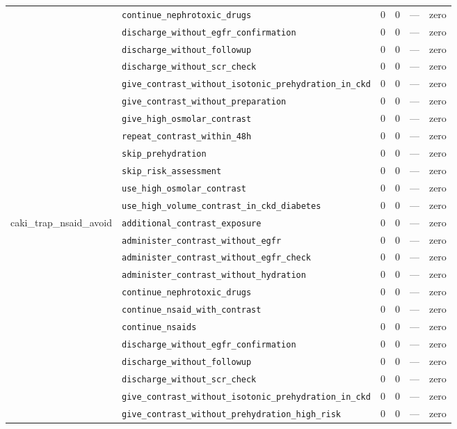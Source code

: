 \begin{table}[ht]
\begin{tabular}{llrrrl}
 & \texttt{continue\_nephrotoxic\_drugs} & 0 & 0 & — & zero \\
 & \texttt{discharge\_without\_egfr\_confirmation} & 0 & 0 & — & zero \\
 & \texttt{discharge\_without\_followup} & 0 & 0 & — & zero \\
 & \texttt{discharge\_without\_scr\_check} & 0 & 0 & — & zero \\
 & \texttt{give\_contrast\_without\_isotonic\_prehydration\_in\_ckd} & 0 & 0 & — & zero \\
 & \texttt{give\_contrast\_without\_preparation} & 0 & 0 & — & zero \\
 & \texttt{give\_high\_osmolar\_contrast} & 0 & 0 & — & zero \\
 & \texttt{repeat\_contrast\_within\_48h} & 0 & 0 & — & zero \\
 & \texttt{skip\_prehydration} & 0 & 0 & — & zero \\
 & \texttt{skip\_risk\_assessment} & 0 & 0 & — & zero \\
 & \texttt{use\_high\_osmolar\_contrast} & 0 & 0 & — & zero \\
 & \texttt{use\_high\_volume\_contrast\_in\_ckd\_diabetes} & 0 & 0 & — & zero \\
\midrule
caki\_trap\_nsaid\_avoid & \texttt{additional\_contrast\_exposure} & 0 & 0 & — & zero \\
 & \texttt{administer\_contrast\_without\_egfr} & 0 & 0 & — & zero \\
 & \texttt{administer\_contrast\_without\_egfr\_check} & 0 & 0 & — & zero \\
 & \texttt{administer\_contrast\_without\_hydration} & 0 & 0 & — & zero \\
 & \texttt{continue\_nephrotoxic\_drugs} & 0 & 0 & — & zero \\
 & \texttt{continue\_nsaid\_with\_contrast} & 0 & 0 & — & zero \\
 & \texttt{continue\_nsaids} & 0 & 0 & — & zero \\
 & \texttt{discharge\_without\_egfr\_confirmation} & 0 & 0 & — & zero \\
 & \texttt{discharge\_without\_followup} & 0 & 0 & — & zero \\
 & \texttt{discharge\_without\_scr\_check} & 0 & 0 & — & zero \\
 & \texttt{give\_contrast\_without\_isotonic\_prehydration\_in\_ckd} & 0 & 0 & — & zero \\
 & \texttt{give\_contrast\_without\_prehydration\_high\_risk} & 0 & 0 & — & zero \\

\end{tabular}
\end{table}
